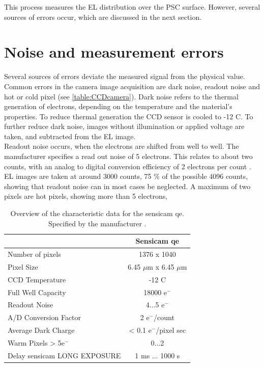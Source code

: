 This process measures the EL distribution over the PSC surface. However, several sources of errors occur, which are discussed in the next section.
\FloatBarrier
\section{Noise and measurement errors}
Several sources of errors deviate the measured signal from the physical value. Common errors in the camera image acquisition are dark noise, readout noise and hot or cold pixel (see \autoref{table:CCDcamera}). Dark noise refers to the thermal generation of electrons, depending on the temperature and the material's properties. To reduce thermal generation the CCD sensor is cooled to -12 \textdegree C. To further reduce dark noise, images without illumination or applied voltage are taken, and subtracted from the EL image.\\

Readout noise occurs, when the electrons are shifted from well to well. The manufacturer specifies a read out noise of 5 electrons. This relates to about two counts, with an analog to digital conversion efficiency of 2 electrons per count \cite{ManualSensicam}. EL images are taken at around 3000 counts, 75 \% of the possible 4096 counts, showing that readout noise can in most cases be neglected. A maximum of two pixels are hot pixels, showing more than 5 electrons,  \\

\begin{table}[h]
	\centering
	\caption{Overview of the characteristic data for the sensicam qe. Specified by the manufacturer \cite{ManualSensicam}.}
	\label{table:CCDcamera}
	\begin{tabular}{l c}
		\hline
		\rowcolor{lightgray}
		& \textbf{Sensicam qe} \\ \hline
		Number of pixels & 1376 x 1040 \\
		Pixel Size & 6.45 $\mu$m x 6.45 $\mu$m \\
		CCD Temperature & -12 \textdegree C \\
		Full Well Capacity & 18000 e$^-$ \\
		Readout Noise & 4...5 e$^-$ \\
		A/D Conversion Factor & 2 e$^-$/count \\
		Average Dark Charge & < 0.1 e$^-$/pixel sec \\
		Warm Pixels > 5e$^-$ & 0...2 \\
		Delay sensicam LONG EXPOSURE & 1 ms ... 1000 s \\ \hline
	\end{tabular}
\end{table}